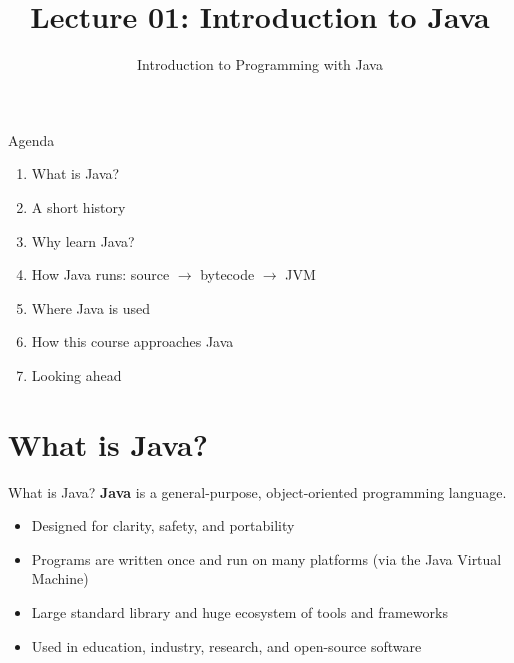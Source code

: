 \documentclass[aspectratio=169,11pt]{beamer}
\title{Lecture 01: Introduction to Java}
\subtitle{Introduction to Programming with Java}
\begin{document}
    \begin{frame}
        \titlepage
    \end{frame}

    \begin{frame}{Agenda}
        \begin{enumerate}
            \item What is Java?
            \item A short history
            \item Why learn Java?
            \item How Java runs: source $\rightarrow$ bytecode $\rightarrow$ JVM
            \item Where Java is used
            \item How this course approaches Java
            \item Looking ahead
        \end{enumerate}
    \end{frame}

    \section{What is Java?}

    \begin{frame}{What is Java?}
        \textbf{Java} is a general-purpose, object-oriented programming language.
        \vspace{0.8em}
        \begin{itemize}
            \item Designed for clarity, safety, and portability
            \item Programs are written once and run on many platforms
            (via the Java Virtual Machine)
            \item Large standard library and huge ecosystem of tools and frameworks
            \item Used in education, industry, research, and open-source software
        \end{itemize}
    \end{frame}
\end{document}

